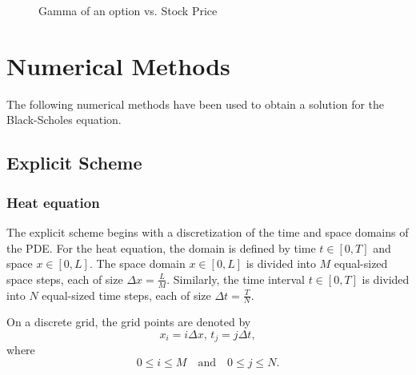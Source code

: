 \begin{figure}[H]
    \centering
    \caption{Gamma of an option vs. Stock Price}
    \label{fig:gamma-plot}
\end{figure}


\section{Numerical Methods}\label{sec:numerical-methods}
The following numerical methods have been used to obtain a solution for the Black-Scholes equation.

\subsection{Explicit Scheme}\label{sec:explicit}

\subsubsection{Heat equation}
The explicit scheme begins with a discretization of the time and space domains of the PDE.
For the heat equation, the domain is defined by time $t \in [0, T]$ and space $x \in [0,L]$. The space domain $x \in [0,L]$ is divided into $M$ equal-sized space steps, each of size ${\Delta x} = \frac{L}{M}$. Similarly, the time interval $t \in [0, T]$ is divided into $N$ equal-sized time steps, each of size ${\Delta t} = \frac{T}{N}$.

On a discrete grid, the grid points are denoted by
\[
x_i = i {\Delta x},\, t_j = j {\Delta t},
\]
where
\[
0 \leq i \leq M \quad \text{and} \quad 0 \leq j \leq N.
\]

